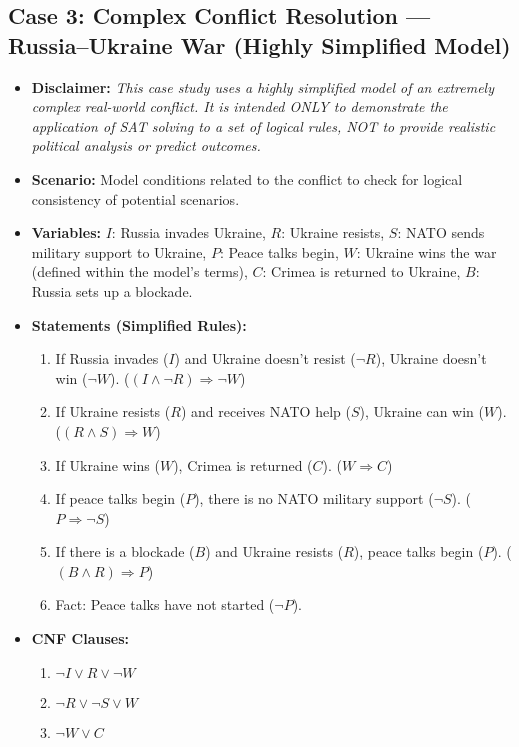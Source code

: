 \documentclass[11pt, a4paper]{article}
\begin{document}
\subsection*{Case 3: Complex Conflict Resolution — Russia–Ukraine War (Highly Simplified Model)}
\begin{itemize}
    \item \textbf{Disclaimer:} \textit{This case study uses a highly simplified model of an extremely complex real-world conflict. It is intended ONLY to demonstrate the application of SAT solving to a set of logical rules, NOT to provide realistic political analysis or predict outcomes.}
    \item \textbf{Scenario:} Model conditions related to the conflict to check for logical consistency of potential scenarios.
    \item \textbf{Variables:}
        $I$: Russia invades Ukraine, $R$: Ukraine resists, $S$: NATO sends military support to Ukraine, $P$: Peace talks begin, $W$: Ukraine wins the war (defined within the model's terms), $C$: Crimea is returned to Ukraine, $B$: Russia sets up a blockade.
    \item \textbf{Statements (Simplified Rules):}
    \begin{enumerate}
        \item If Russia invades ($I$) and Ukraine doesn't resist ($\neg R$), Ukraine doesn't win ($\neg W$). ($(I \wedge \neg R) \Rightarrow \neg W$)
        \item If Ukraine resists ($R$) and receives NATO help ($S$), Ukraine can win ($W$). ($(R \wedge S) \Rightarrow W$)
        \item If Ukraine wins ($W$), Crimea is returned ($C$). ($W \Rightarrow C$)
        \item If peace talks begin ($P$), there is no NATO military support ($\neg S$). ($P \Rightarrow \neg S$)
        \item If there is a blockade ($B$) and Ukraine resists ($R$), peace talks begin ($P$). ($(B \wedge R) \Rightarrow P$)
        \item Fact: Peace talks have not started ($\neg P$).
    \end{enumerate}
    \item \textbf{CNF Clauses:}
    \begin{enumerate}
        \item $\neg I \vee R \vee \neg W$
        \item $\neg R \vee \neg S \vee W$
        \item $\neg W \vee C$

\end{enumerate}
\end{itemize}
\end{document}
